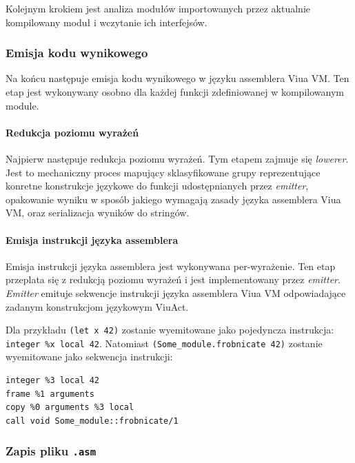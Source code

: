 \documentclass[11pt,oneside,a4paper,titlepage,onecolumn]{article}
\begin{document}
Kolejnym krokiem jest analiza modułów importowanych przez aktualnie kompilowany moduł i wczytanie ich
interfejsów.

\subsubsection{Emisja kodu wynikowego}
\label{opis_etapow_kompilacji_emisja_kodu_wynikowego}

Na końcu następuje emisja kodu wynikowego w języku assemblera Viua VM. Ten etap jest wykonywany osobno dla
każdej funkcji zdefiniowanej w kompilowanym module.

\paragraph{Redukcja poziomu wyrażeń}

Najpierw następuje redukcja poziomu wyrażeń. Tym etapem zajmuje się \emph{lowerer}. Jest to mechaniczny proces
mapujący sklasyfikowane grupy reprezentujące konretne konstrukcje językowe do funkcji udostępnianych przez
\emph{emitter}, opakowanie wyniku w sposób jakiego wymagają zasady języka assemblera Viua VM, oraz
serializacja wyników do stringów.

\paragraph{Emisja instrukcji języka assemblera}

Emisja instrukcji języka assemblera jest wykonywana per-wyrażenie. Ten etap przeplata się z redukcją poziomu
wyrażeń i jest implementowany przez \emph{emitter}. \emph{Emitter} emituje sekwencje instrukcji języka
assemblera Viua VM odpowiadające zadanym konstrukcjom językowym ViuAct.

Dla przykładu \texttt{(let x 42)} zostanie wyemitowane jako pojedyncza instrukcja: \texttt{integer \%x local
42}.  Natomiast \texttt{(Some\_module.frobnicate 42)} zostanie wyemitowane jako sekwencja instrukcji:

\begin{lstlisting}
integer %3 local 42
frame %1 arguments
copy %0 arguments %3 local
call void Some_module::frobnicate/1
\end{lstlisting}

\subsubsection{Zapis pliku \texttt{.asm}}
\end{document}

